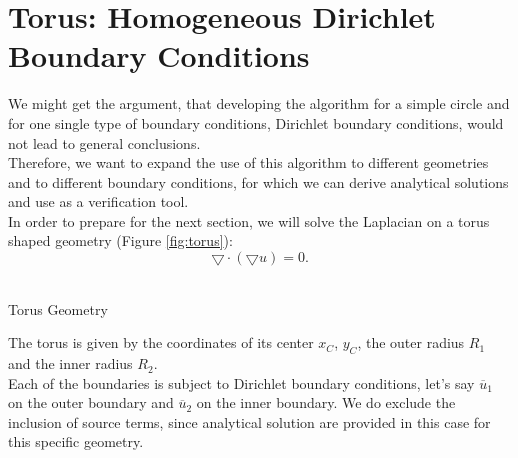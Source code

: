 \documentclass[a4paper,12pt]{article}
\makeatletter
\newenvironment{figurehere}
  {\def\@captype{figure}}
  {}
\makeatother
\begin{document}
\section{Torus: Homogeneous Dirichlet Boundary Conditions}\label{sec:torusdirichlet}
We might get the argument, that developing the algorithm for a simple circle and for one single type of boundary conditions, Dirichlet boundary conditions, would not lead to general conclusions.\\
Therefore, we want to expand the use of this algorithm to different geometries and to different boundary conditions, for which we can derive analytical solutions and use as a verification tool.\\
In order to prepare for the next section, we will solve the Laplacian on a torus shaped geometry (Figure \ref{fig:torus}):
\begin{equation}
 \bigtriangledown\cdot( \bigtriangledown u)=0.
\end{equation}
\begin{center}
\begin{figurehere}
\\
\caption{Torus Geometry}\label{fig:torus}
\end{figurehere}
\end{center}
The torus is given by the coordinates of its center $x_C$, $y_C$, the outer radius $R_1$ and the inner radius $R_2$. \\
Each of the boundaries is subject to Dirichlet boundary conditions, let's say $\overline{u}_1$ on the outer boundary and $\overline{u}_2$ on the inner boundary. We do exclude the inclusion of source terms, since analytical solution are provided in this case for this specific geometry.\\
\end{document}
